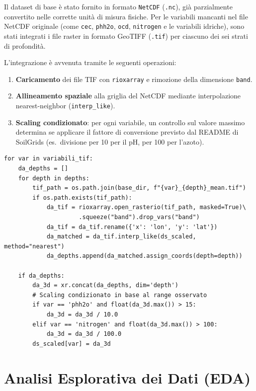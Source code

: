 \documentclass[a4paper,12pt]{article}
\begin{document}
Il dataset di base è stato fornito in formato \texttt{NetCDF}
(\texttt{.nc}), già parzialmente convertito nelle corrette unità di
misura fisiche. Per le variabili mancanti nel file NetCDF originale
(come \texttt{cec}, \texttt{phh2o}, \texttt{ocd}, \texttt{nitrogen} e
le variabili idriche), sono stati integrati i file raster in formato
GeoTIFF (\texttt{.tif}) per ciascuno dei sei strati di profondità.

L'integrazione è avvenuta tramite le seguenti operazioni:

\begin{enumerate}
    \item \textbf{Caricamento} dei file TIF con \texttt{rioxarray} e
    rimozione della dimensione \texttt{band}.
    \item \textbf{Allineamento spaziale} alla griglia del NetCDF
    mediante interpolazione nearest-neighbor
    (\texttt{interp\_like}).
    \item \textbf{Scaling condizionato}: per ogni variabile, un
    controllo sul valore massimo determina se applicare il fattore di
    conversione previsto dal README di SoilGrids (es.\ divisione per 10
    per il pH, per 100 per l'azoto).
    
\end{enumerate}


\begin{lstlisting}[caption={Integrazione dei file TIF con scaling condizionato.},label={lst:tif}]
for var in variabili_tif:
    da_depths = []
    for depth in depths:
        tif_path = os.path.join(base_dir, f"{var}_{depth}_mean.tif")
        if os.path.exists(tif_path):
            da_tif = rioxarray.open_rasterio(tif_path, masked=True)\
                     .squeeze("band").drop_vars("band")
            da_tif = da_tif.rename({'x': 'lon', 'y': 'lat'})
            da_matched = da_tif.interp_like(ds_scaled, method="nearest")
            da_depths.append(da_matched.assign_coords(depth=depth))

    if da_depths:
        da_3d = xr.concat(da_depths, dim='depth')
        # Scaling condizionato in base al range osservato
        if var == 'phh2o' and float(da_3d.max()) > 15:
            da_3d = da_3d / 10.0
        elif var == 'nitrogen' and float(da_3d.max()) > 100:
            da_3d = da_3d / 100.0
        ds_scaled[var] = da_3d
\end{lstlisting}


\section{Analisi Esplorativa dei Dati (EDA)}
\label{sec:eda}
\end{document}
